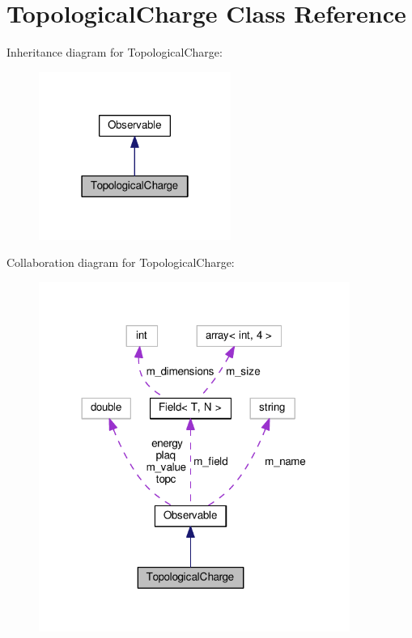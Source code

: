 \hypertarget{classTopologicalCharge}{}\section{Topological\+Charge Class Reference}
\label{classTopologicalCharge}


Inheritance diagram for Topological\+Charge\+:\nopagebreak
\begin{figure}[H]
\begin{center}
\leavevmode
\includegraphics[width=178pt]{classTopologicalCharge__inherit__graph}
\end{center}
\end{figure}


Collaboration diagram for Topological\+Charge\+:\nopagebreak
\begin{figure}[H]
\begin{center}
\leavevmode
\includegraphics[width=288pt]{classTopologicalCharge__coll__graph}
\end{center}
\end{figure}
